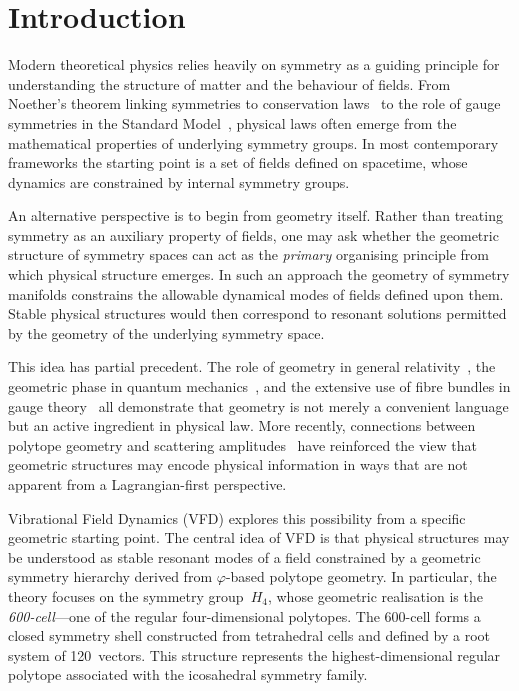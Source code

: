 \documentclass[12pt,a4paper]{article}
\newcommand{\Hfour}{H_4}
\newcommand{\vphi}{\varphi}
\begin{document}
\newpage
\tableofcontents
\newpage

\section{Introduction}\label{sec:intro}

Modern theoretical physics relies heavily on symmetry as a guiding principle
for understanding the structure of matter and the behaviour of fields.  From
Noether's theorem linking symmetries to conservation laws~\cite{noether1918}
to the role of gauge symmetries in the Standard
Model~\cite{weinberg1996}, physical laws often emerge from the mathematical
properties of underlying symmetry groups.  In most contemporary frameworks the
starting point is a set of fields defined on spacetime, whose dynamics are
constrained by internal symmetry groups.

An alternative perspective is to begin from geometry itself.  Rather than
treating symmetry as an auxiliary property of fields, one may ask whether the
geometric structure of symmetry spaces can act as the \emph{primary}
organising principle from which physical structure emerges.  In such an
approach the geometry of symmetry manifolds constrains the allowable dynamical
modes of fields defined upon them.  Stable physical structures would then
correspond to resonant solutions permitted by the geometry of the underlying
symmetry space.

This idea has partial precedent.  The role of geometry in general
relativity~\cite{mtw1973}, the geometric phase in quantum
mechanics~\cite{berry1984}, and the extensive use of fibre bundles in gauge
theory~\cite{nakahara2003} all demonstrate that geometry is not merely a
convenient language but an active ingredient in physical law.  More recently,
connections between polytope geometry and scattering
amplitudes~\cite{arkani2014} have reinforced the view that geometric
structures may encode physical information in ways that are not apparent from
a Lagrangian-first perspective.

Vibrational Field Dynamics (VFD) explores this possibility from a specific
geometric starting point.  The central idea of VFD is that physical structures
may be understood as stable resonant modes of a field constrained by a
geometric symmetry hierarchy derived from $\vphi$-based polytope geometry.  In
particular, the theory focuses on the symmetry group~$\Hfour$, whose geometric
realisation is the \emph{600-cell}---one of the regular four-dimensional
polytopes.  The 600-cell forms a closed symmetry shell constructed from
tetrahedral cells and defined by a root system of 120~vectors.  This structure
represents the highest-dimensional regular polytope associated with the
icosahedral symmetry family.
\end{document}
